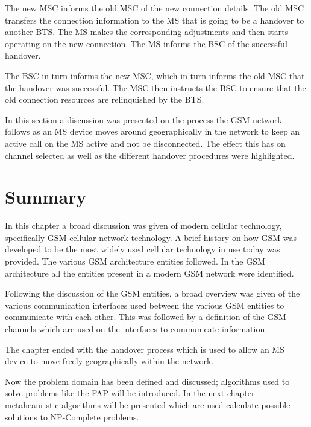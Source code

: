 \begin{description}
The new MSC informs the old MSC of the new connection details. The old MSC transfers the connection information to the MS that is going to be a handover to another BTS. The MS makes the corresponding adjustments and then starts operating on the new connection. The MS informs the BSC of the successful handover\cite{wirelesstelcoMullet,GSMArchitectureProtocolsServices}. 

The BSC in turn informs the new MSC, which in turn informs the old MSC that the handover was successful. The MSC then instructs the BSC to ensure that the old connection resources are relinquished by the BTS.
\end{description}

In this section a discussion was presented on the process the GSM network follows as an MS device moves around geographically in the network to keep an active call on the MS active and not be disconnected. The effect this has on channel selected as well as the different handover procedures were highlighted. 
\section{Summary}
In this chapter a broad discussion was given of modern cellular technology, specifically GSM cellular network technology. A brief history on how GSM was developed to be the most widely used cellular technology in use today was provided. The various GSM architecture entities followed. In the GSM architecture all the entities present in a modern GSM network were identified.

Following the discussion of the GSM entities, a broad overview was given of the various communication interfaces used between the various GSM entities to communicate with each other. This was followed by a definition of the GSM channels which are used on the interfaces to communicate information.

The chapter ended with the handover process which is used to allow an MS device to move freely geographically within the network. 

Now the problem domain has been defined and discussed; algorithms used to solve problems like the FAP will be introduced. In the next chapter metaheauristic algorithms will be presented which are used calculate possible solutions to NP-Complete problems.
